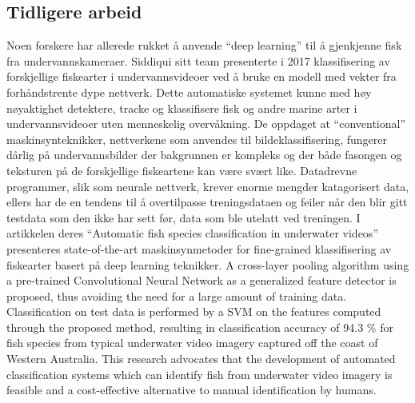 
\subsection{Tidligere arbeid}

Noen forskere har allerede rukket å anvende ``deep learning'' til å gjenkjenne fisk fra undervannskameraer. Siddiqui sitt team presenterte i 2017 klassifisering av forskjellige fiskearter i undervannsvideoer ved å bruke en modell  med vekter fra forhåndstrente dype nettverk. Dette automatiske systemet kunne med høy nøyaktighet detektere, tracke og klassifisere fisk og andre marine arter i undervannsvideoer uten menneskelig overvåkning. De oppdaget at ``conventional'' maskinsynteknikker, nettverkene som anvendes til bildeklassifisering, fungerer dårlig på undervannsbilder der bakgrunnen er kompleks og der både fasongen og teksturen på de forskjellige fiskeartene kan være svært like. Datadrevne programmer, slik som neurale nettverk, krever enorme mengder katagorisert data, ellers har de en tendens til å overtilpasse treningsdataen og feiler når den blir gitt testdata som den ikke har sett før, data som ble utelatt ved treningen. I artikkelen deres  ``Automatic fish species classification in underwater videos'' presenteres state-of-the-art maskinsynmetoder for ﬁne-grained klassifisering av fiskearter basert på deep learning teknikker. A cross-layer pooling algorithm using a pre-trained Convolutional Neural Network as a generalized feature detector is proposed, thus avoiding the need for a large amount of training data. Classiﬁcation on test data is performed by a SVM on the features computed through the proposed method, resulting in classiﬁcation accuracy of 94.3 \% for ﬁsh species from typical underwater video imagery captured off the coast of Western Australia. This research advocates that the development of automated classiﬁcation systems which can identify ﬁsh from underwater video imagery is feasible and a cost-effective alternative to manual identiﬁcation by humans. \cite{Siddiqui m.fl. 2017}

